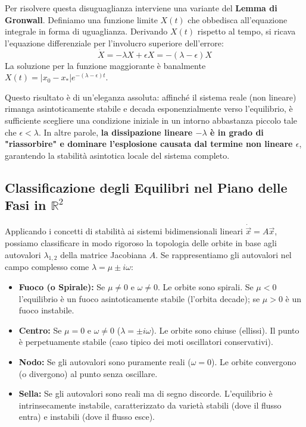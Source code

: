 \documentclass[12pt,a4paper]{article}
\begin{document}
Per risolvere questa disuguaglianza interviene una variante del \textbf{Lemma di Gronwall}. Definiamo una funzione limite $X(t)$ che obbedisca all'equazione integrale in forma di uguaglianza. Derivando $X(t)$ rispetto al tempo, si ricava l'equazione differenziale per l'involucro superiore dell'errore:
\begin{equation}
\dot{X} = -\lambda X + \epsilon X = -(\lambda - \epsilon)X
\end{equation}
La soluzione per la funzione maggiorante è banalmente $X(t) = |x_0 - x_*| e^{-(\lambda - \epsilon)t}$. 

Questo risultato è di un'eleganza assoluta: affinché il sistema reale (non lineare) rimanga asintoticamente stabile e decada esponenzialmente verso l'equilibrio, è sufficiente scegliere una condizione iniziale in un intorno abbastanza piccolo tale che $\epsilon < \lambda$. In altre parole, \textbf{la dissipazione lineare $-\lambda$ è in grado di "riassorbire" e dominare l'esplosione causata dal termine non lineare $\epsilon$}, garantendo la stabilità asintotica locale del sistema completo.

\subsection{Classificazione degli Equilibri nel Piano delle Fasi in $\mathbb{R}^2$}
Applicando i concetti di stabilità ai sistemi bidimensionali lineari $\dot{\vec{x}} = A\vec{x}$, possiamo classificare in modo rigoroso la topologia delle orbite in base agli autovalori $\lambda_{1,2}$ della matrice Jacobiana $A$. Se rappresentiamo gli autovalori nel campo complesso come $\lambda = \mu \pm i\omega$:
\begin{itemize}
    \item \textbf{Fuoco (o Spirale):} Se $\mu \neq 0$ e $\omega \neq 0$. Le orbite sono spirali. Se $\mu < 0$ l'equilibrio è un fuoco asintoticamente stabile (l'orbita decade); se $\mu > 0$ è un fuoco instabile.
    \item \textbf{Centro:} Se $\mu = 0$ e $\omega \neq 0$ ($\lambda = \pm i\omega$). Le orbite sono chiuse (ellissi). Il punto è perpetuamente stabile (caso tipico dei moti oscillatori conservativi).
    \item \textbf{Nodo:} Se gli autovalori sono puramente reali ($\omega = 0$). Le orbite convergono (o divergono) al punto senza oscillare.
    \item \textbf{Sella:} Se gli autovalori sono reali ma di segno discorde. L'equilibrio è intrinsecamente instabile, caratterizzato da varietà stabili (dove il flusso entra) e instabili (dove il flusso esce).
\end{itemize}
\end{document}
